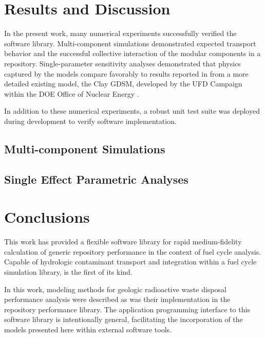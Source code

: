 \section{Results and Discussion}
\label{sec:results}

In the present work, many numerical experiments successfully verified the \Cyder software library.
Multi-component simulations demonstrated expected transport behavior and
the successful collective interaction of the modular
components in a \Cyder repository. Single-parameter sensitivity analyses
demonstrated that physics captured by the \Cyder models compare favorably to
results reported in \cite{huff_key_2012} from a more detailed existing model,
the Clay \gls{GDSM}, developed by the \gls{UFD} Campaign within the
\gls{DOE} Office of Nuclear Energy \cite{clayton_generic_2011}.

In addition to these numerical experiments, a robust unit test suite was
deployed during development to verify \Cyder software implementation.

\subsection{Multi-component Simulations}




\subsection{Single Effect Parametric Analyses}


\section{Conclusions}

This work has provided a flexible software library for rapid medium-fidelity
calculation of generic repository performance in the context of fuel cycle
analysis.  Capable of hydrologic contaminant transport and integration within a
fuel cycle simulation library, \Cyder is the first of its kind.

In this work, modeling methods for geologic radioactive waste disposal
performance analysis were described as was their implementation in the \Cyder
repository performance library. The application programming interface to this
software library is intentionally general, facilitating the incorporation of
the models presented here within external software tools.

